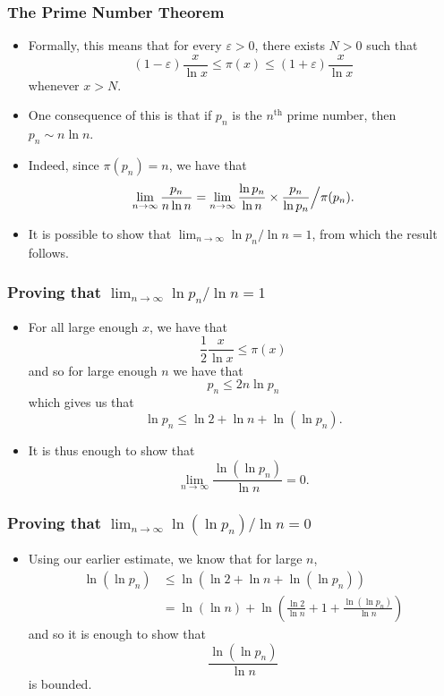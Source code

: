 \documentclass{beamer}
\begin{document}
\begin{frame}
    \frametitle{The Prime Number Theorem}

    \begin{itemize}
        \item Formally, this means that for every $\varepsilon > 0$, there exists $N > 0$ such that
        \[
            (1 - \varepsilon) \frac{x}{\ln x} \leq \pi(x) \leq (1 + \varepsilon) \frac{x}{\ln x}
        \]
        whenever $x > N$. \pause
        \item One consequence of this is that if $p_n$ is the $n^\text{th}$ prime number, then $p_n \sim n \ln n$. \pause
        \item Indeed, since $\pi(p_n) = n$, we have that
        \[
            \lim_{n \to \infty} \frac{p_n}{n \ln n} = \lim_{n \to \infty} \frac{\ln p_n}{\ln n} \times \frac{p_n}{\ln p_n} \Big\slash \pi(p_n).
        \]
        \pause
        \item It is possible to show that $\lim_{n \to \infty} \ln p_n \slash \ln n = 1$, from which the result follows.
    \end{itemize}

\end{frame}

\begin{frame}
    \frametitle{Proving that $\lim_{n \to \infty} \ln p_n \slash \ln n = 1$}

    \begin{itemize}
        \item For all large enough $x$, we have that
        \[
            \frac{1}{2} \frac{x}{\ln x} \leq \pi(x)
        \]
        and so for large enough $n$ we have that
        \[
            p_n \leq 2 n \ln p_n
        \]
        which gives us that
        \[
            \ln p_n \leq \ln 2 + \ln n + \ln(\ln p_n).
        \]
        \pause
        \item It is thus enough to show that
        \[
            \lim_{n \to \infty} \frac{\ln(\ln p_n)}{\ln n} = 0.
        \]
    \end{itemize}

\end{frame}

\begin{frame}
    \frametitle{Proving that $\lim_{n \to \infty} \ln(\ln p_n) \slash \ln n = 0$}

    \begin{itemize}
        \item Using our earlier estimate, we know that for large $n$,
        \begin{align*}
            \ln(\ln p_n) & \leq \ln\left(\ln 2 + \ln n + \ln(\ln p_n) \right) \\
            & = \ln(\ln n) + \ln\left(\frac{\ln 2}{\ln n} + 1 + \frac{\ln(\ln p_n)}{\ln n}\right)
        \end{align*}
        and so it is enough to show that
        \[
            \frac{\ln(\ln p_n)}{\ln n}
        \]
        is bounded.
    \end{itemize}

\end{frame}
\end{document}
